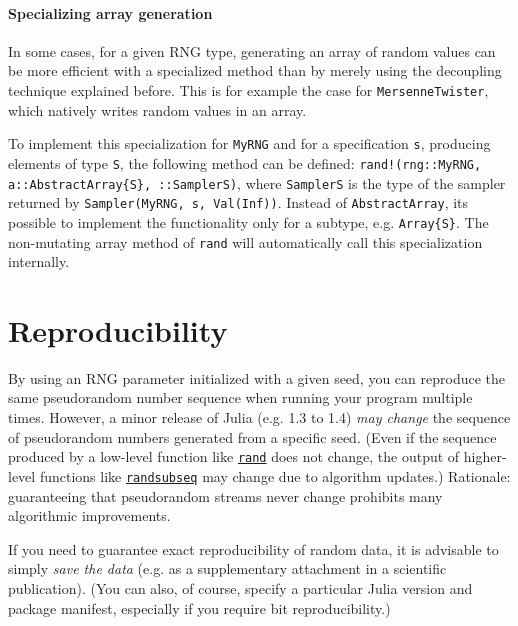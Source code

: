 \hypertarget{9194362945868125985}{}


\subsubsection{Specializing array generation}



In some cases, for a given RNG type, generating an array of random values can be more efficient with a specialized method than by merely using the decoupling technique explained before. This is for example the case for \texttt{MersenneTwister}, which natively writes random values in an array.



To implement this specialization for \texttt{MyRNG} and for a specification \texttt{s}, producing elements of type \texttt{S}, the following method can be defined: \texttt{rand!(rng::MyRNG, a::AbstractArray\{S\}, ::SamplerS)}, where \texttt{SamplerS} is the type of the sampler returned by \texttt{Sampler(MyRNG, s, Val(Inf))}. Instead of \texttt{AbstractArray}, it{\textquotesingle}s possible to implement the functionality only for a subtype, e.g. \texttt{Array\{S\}}. The non-mutating array method of \texttt{rand} will automatically call this specialization internally.





\hypertarget{3655118098996655995}{}


\chapter{Reproducibility}



By using an RNG parameter initialized with a given seed, you can reproduce the same pseudorandom number sequence when running your program multiple times.  However, a minor release of Julia (e.g. 1.3 to 1.4) \emph{may change} the sequence of pseudorandom numbers generated from a specific seed.  (Even if the sequence produced by a low-level function like \hyperlink{7668863842145012694}{\texttt{rand}} does not change, the output of higher-level functions like \hyperlink{10454370655022505544}{\texttt{randsubseq}} may change due to algorithm updates.)   Rationale: guaranteeing that pseudorandom streams never change prohibits many algorithmic improvements.



If you need to guarantee exact reproducibility of random data, it is advisable to simply \emph{save the data} (e.g. as a supplementary attachment in a scientific publication).  (You can also, of course, specify a particular Julia version and package manifest, especially if you require bit reproducibility.)




